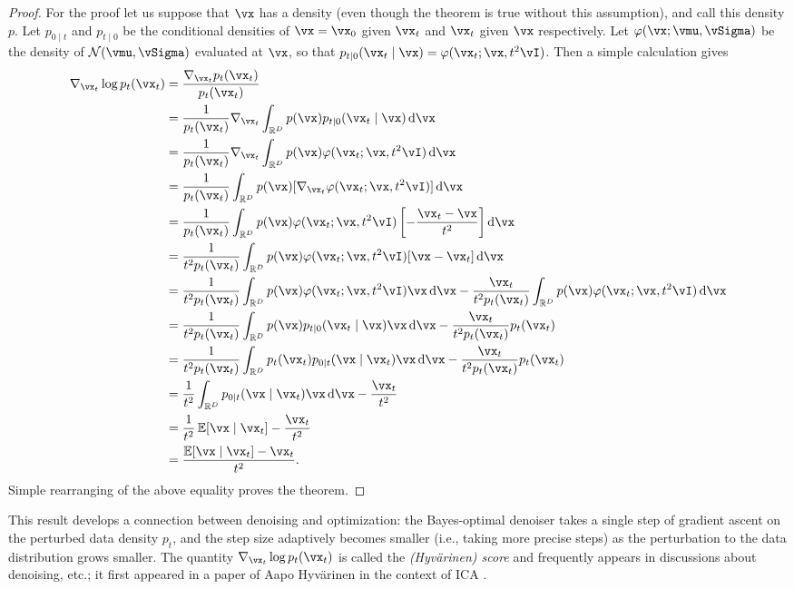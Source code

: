 \documentclass[../../book-main.tex]{subfiles}
\begin{document}
\begin{proof}
	For the proof let us suppose that \(\vx\) has a density (even though the
	theorem is true without this assumption), and call this density \(p\). Let
	\(p_{0 \mid t}\) and \(p_{t \mid 0}\) be the conditional densities of \(\vx
	= \vx_{0}\) given \(\vx_{t}\) and \(\vx_{t}\) given \(\vx\) respectively.
	Let \(\phi(\vx ; \vmu, \vSigma)\) be the density of \(\dNorm(\vmu,
	\vSigma)\) evaluated at \(\vx\), so that \(p_{t \mid 0}(\vx_{t} \mid \vx)
	= \phi(\vx_{t} ; \vx, t^{2}\vI)\). Then a simple calculation gives 
	\begin{align}
		\nabla_{\vx_{t}} \log p_{t}(\vx_{t})
		&= \frac{\nabla_{\vx_{t}}p_{t}(\vx_{t})}{p_{t}(\vx_{t})} \\
		&= \frac{1}{p_{t}(\vx_{t})}\nabla_{\vx_{t}}\int_{\R^{D}}p(\vx)p_{t \mid 0}(\vx_{t} \mid \vx)\odif{\vx} \\
		&=
		\frac{1}{p_{t}(\vx_{t})}\nabla_{\vx_{t}}\int_{\R^{D}}p(\vx)\phi(\vx_{t}
		;\vx, t^{2}\vI)\odif{\vx} \\
		&=
		\frac{1}{p_{t}(\vx_{t})}\int_{\R^{D}}p(\vx)[\nabla_{\vx_{t}}\phi(\vx_{t}
		;\vx, t^{2}\vI)]\odif{\vx} \\
		&= \frac{1}{p_{t}(\vx_{t})}\int_{\R^{D}}p(\vx)\phi(\vx_{t} ; \vx, t^{2}\vI)\bs{-\frac{\vx_{t} - \vx}{t^{2}}}\odif{\vx} \\
		&= \frac{1}{t^{2}p_{t}(\vx_{t})}\int_{\R^{D}}p(\vx)\phi(\vx_{t} ; \vx, t^{2}\vI)[\vx - \vx_{t}]\odif{\vx} \\
		&= \frac{1}{t^{2}p_{t}(\vx_{t})}\int_{\R^{D}}p(\vx)\phi(\vx_{t} ; \vx,
		t^{2}\vI)\vx \odif{\vx}
		- \frac{\vx_{t}}{t^{2}p_{t}(\vx_{t})}\int_{\R^{D}}p(\vx)\phi(\vx_{t} ; \vx, t^{2}\vI)\odif{\vx} \\
		&= \frac{1}{t^{2}p_{t}(\vx_{t})}\int_{\R^{D}}p(\vx)p_{t \mid 0}(\vx_{t} \mid \vx)\vx \odif{\vx} - \frac{\vx_{t}}{t^{2}p_{t}(\vx_{t})}p_{t}(\vx_{t}) \\
		&= \frac{1}{t^{2}p_{t}(\vx_{t})}\int_{\R^{D}}p_{t}(\vx_{t})p_{0 \mid t}(\vx \mid \vx_{t})\vx \odif{\vx} - \frac{\vx_{t}}{t^{2}p_{t}(\vx_{t})}p_{t}(\vx_{t}) \\
		&= \frac{1}{t^{2}}\int_{\R^{D}}p_{0 \mid t}(\vx \mid \vx_{t})\vx \odif{\vx} - \frac{\vx_{t}}{t^{2}} \\
		&= \frac{1}{t^{2}}\Ex[\vx \mid \vx_{t}] - \frac{\vx_{t}}{t^{2}} \\
		&= \frac{\Ex[\vx \mid \vx_{t}] - \vx_{t}}{t^{2}}.
	\end{align}
	Simple rearranging of the above equality proves the theorem.
\end{proof}
This result develops a connection between denoising and optimization: the Bayes-optimal denoiser takes a single step of gradient ascent on the perturbed data density \(p_{t}\), and the step size adaptively becomes smaller (i.e., taking more precise steps) as the perturbation to the data distribution grows smaller. The quantity \(\nabla_{\vx_{t}}\log p_{t}(\vx_{t})\) is called the \textit{(Hyv\"arinen) score} and frequently appears in discussions about denoising, etc.; it first appeared in a paper of Aapo Hyv\"arinen in the context of ICA \cite{hyvarinen05a}.
\end{document}
